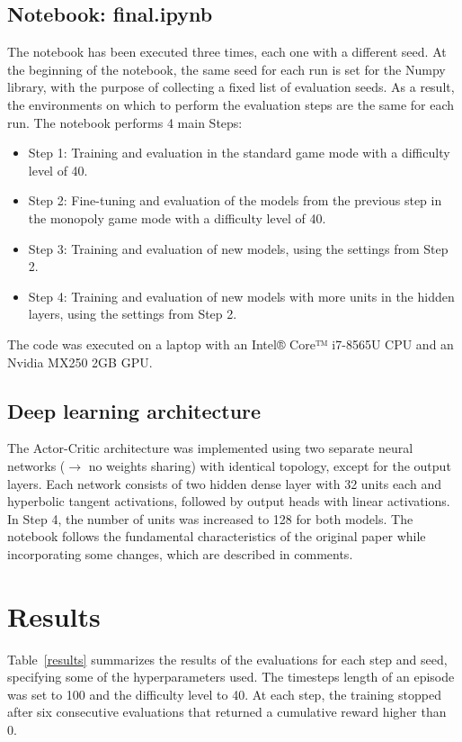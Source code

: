 \documentclass{article}
\begin{document}
\subsection{Notebook: final.ipynb}
The notebook has been executed three times, each one with a different seed. 
At the beginning of the notebook, the same seed for each run is set for the Numpy library, with the purpose of collecting a fixed list of evaluation seeds. As a result, the environments on which to perform the evaluation steps are the same for each run.
The notebook performs 4 main Steps:
\begin{itemize}
    \item Step 1: Training and evaluation in the standard game mode with a difficulty level of 40.
    \item Step 2: Fine-tuning and evaluation of the models from the previous step in the monopoly game mode with a difficulty level of 40.
    \item Step 3: Training and evaluation of new models, using the settings from Step 2.
    \item Step 4: Training and evaluation of new models with more units in the hidden layers, using the settings from Step 2.
\end{itemize}

The code was executed on a laptop with an Intel® Core™ i7-8565U CPU and an Nvidia MX250 2GB GPU.


\subsection{Deep learning architecture}
The Actor-Critic architecture was implemented using two separate neural networks (\(\rightarrow\) no weights sharing) with identical topology, except for the output layers. Each network consists of two hidden dense layer with 32 units each and hyperbolic tangent activations, followed by output heads with linear activations. In Step 4, the number of units was increased to 128 for both models. The notebook follows the fundamental characteristics of the original paper while incorporating some changes, which are described in comments.


\section{Results}
Table~\ref{results} summarizes the results of the evaluations for each step and seed, specifying some of the hyperparameters used.
The timesteps length of an episode was set to 100 and the difficulty level to 40. At each step, the training stopped after six consecutive evaluations that returned a cumulative reward higher than 0.
\end{document}
